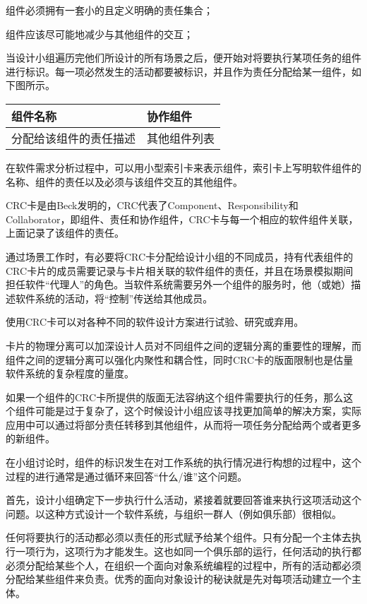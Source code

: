 \begin{compactitem}
\item 组件必须拥有一套小的且定义明确的责任集合；
\item 组件应该尽可能地减少与其他组件的交互；
\end{compactitem}


当设计小组遍历完他们所设计的所有场景之后，便开始对将要执行某项任务的组件进行标识。每一项必然发生的活动都要被标识，并且作为责任分配给某一组件，如下图所示。


\begin{table}[htbp]
\centering
\begin{tabular}{|l|l|}
\hline
组件名称 & 协作组件\\
\hline
分配给该组件的责任描述&其他组件列表\\
\hline
\end{tabular}
\end{table}

在软件需求分析过程中，可以用小型索引卡来表示组件，索引卡上写明软件组件的名称、组件的责任以及必须与该组件交互的其他组件。

CRC卡是由Beck发明的，CRC代表了Component、Responsibility和Collaborator，即组件、责任和协作组件，CRC卡与每一个相应的软件组件关联，上面记录了该组件的责任。

通过场景工作时，有必要将CRC卡分配给设计小组的不同成员，持有代表组件的CRC卡片的成员需要记录与卡片相关联的软件组件的责任，并且在场景模拟期间担任软件“代理人”的角色。当软件系统需要另外一个组件的服务时，他（或她）描述软件系统的活动，将“控制”传送给其他成员。

使用CRC卡可以对各种不同的软件设计方案进行试验、研究或弃用。

卡片的物理分离可以加深设计人员对不同组件之间的逻辑分离的重要性的理解，而组件之间的逻辑分离可以强化内聚性和耦合性，同时CRC卡的版面限制也是估量软件系统的复杂程度的量度。

如果一个组件的CRC卡所提供的版面无法容纳这个组件需要执行的任务，那么这个组件可能是过于复杂了，这个时候设计小组应该寻找更加简单的解决方案，实际应用中可以通过将部分责任转移到其他组件，从而将一项任务分配给两个或者更多的新组件。


在小组讨论时，组件的标识发生在对工作系统的执行情况进行构想的过程中，这个过程的进行通常是通过循环来回答“什么/谁”这个问题。

首先，设计小组确定下一步执行什么活动，紧接着就要回答谁来执行这项活动这个问题。以这种方式设计一个软件系统，与组织一群人（例如俱乐部）很相似。


任何将要执行的活动都必须以责任的形式赋予给某个组件。只有分配一个主体去执行一项行为，这项行为才能发生。这也如同一个俱乐部的运行，任何活动的执行都必须分配给某些个人，在组织一个面向对象系统编程的过程中，所有的活动都必须分配给某些组件来负责。优秀的面向对象设计的秘诀就是先对每项活动建立一个主体。

